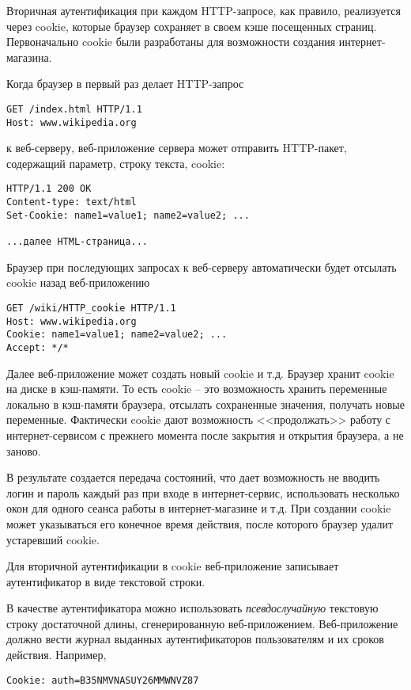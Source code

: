 Вторичная аутентификация при каждом HTTP-запросе, как правило, реализуется через cookie, которые браузер сохраняет в своем кэше посещенных страниц. Первоначально cookie были разработаны для возможности создания интернет-магазина.

Когда браузер в первый раз делает HTTP-запрос
\begin{center} \begin{verbatim}
GET /index.html HTTP/1.1
Host: www.wikipedia.org
\end{verbatim} \end{center}
к веб-серверу, веб-приложение сервера может отправить HTTP-пакет, содержащий параметр, строку текста, cookie:
\begin{center} \begin{verbatim}
HTTP/1.1 200 OK
Content-type: text/html
Set-Cookie: name1=value1; name2=value2; ...

...далее HTML-страница...
\end{verbatim} \end{center}
Браузер при последующих запросах к веб-серверу автоматически будет отсылать cookie назад веб-приложению
\begin{center} \begin{verbatim}
GET /wiki/HTTP_cookie HTTP/1.1
Host: www.wikipedia.org
Cookie: name1=value1; name2=value2; ...
Accept: */*
\end{verbatim} \end{center}

Далее веб-приложение может создать новый cookie и т.д. Браузер хранит cookie на диске в кэш-памяти. То есть cookie -- это возможность хранить переменные локально в кэш-памяти браузера, отсылать сохраненные значения, получать новые переменные. Фактически cookie дают возможность <<продолжать>> работу с интернет-сервисом с прежнего момента после закрытия и открытия браузера, а не заново.

В результате создается передача состояний, что дает возможность не вводить логин и пароль каждый раз при входе в интернет-сервис, использовать несколько окон для одного сеанса работы в интернет-магазине и т.д. При создании cookie может указываться его конечное время действия, после которого браузер удалит устаревший cookie.

Для вторичной аутентификации в cookie веб-приложение записывает аутентификатор в виде текстовой строки.

В качестве аутентификатора можно использовать \emph{псевдослучайную} текстовую строку достаточной длины, сгенерированную веб-приложением. Веб-приложение должно вести журнал выданных аутентификаторов пользователям и их сроков действия. Например,
\begin{center} \begin{verbatim}
Cookie: auth=B35NMVNASUY26MMWNVZ87
\end{verbatim} \end{center}

